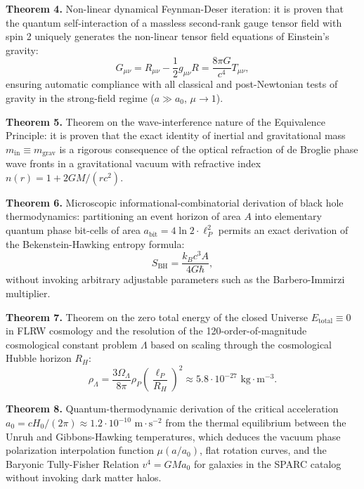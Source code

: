 \documentclass[11pt,a4paper]{article}
\theoremstyle{definition}
\begin{document}
\textbf{Theorem 4.} Non-linear dynamical Feynman-Deser iteration: it is proven that the quantum self-interaction of a massless second-rank gauge tensor field with spin 2 uniquely generates the non-linear tensor field equations of Einstein's gravity:
\begin{equation}\label{eq:0.6}\tag{0.6}
G_{\mu\nu} = R_{\mu\nu} - \frac{1}{2} g_{\mu\nu} R = \frac{8\pi G}{c^4} T_{\mu\nu},
\end{equation}
ensuring automatic compliance with all classical and post-Newtonian tests of gravity in the strong-field regime ($a \gg a_0$, $\mu \to 1$).

\textbf{Theorem 5.} Theorem on the wave-interference nature of the Equivalence Principle: it is proven that the exact identity of inertial and gravitational mass $m_{\text{in}} \equiv m_{\text{grav}}$ is a rigorous consequence of the optical refraction of de Broglie phase wave fronts in a gravitational vacuum with refractive index $n(r) = 1 + 2GM / (rc^2)$.

\textbf{Theorem 6.} Microscopic informational-combinatorial derivation of black hole thermodynamics: partitioning an event horizon of area $A$ into elementary quantum phase bit-cells of area $a_{\text{bit}} = 4\ln 2 \cdot \ell_P^2$ permits an exact derivation of the Bekenstein-Hawking entropy formula:
\begin{equation}\label{eq:0.7}\tag{0.7}
S_{\text{BH}} = \frac{k_B c^3 A}{4 G \hbar},
\end{equation}
without invoking arbitrary adjustable parameters such as the Barbero-Immirzi multiplier.

\textbf{Theorem 7.} Theorem on the zero total energy of the closed Universe $E_{\text{total}} \equiv 0$ in FLRW cosmology and the resolution of the 120-order-of-magnitude cosmological constant problem $\Lambda$ based on scaling through the cosmological Hubble horizon $R_H$:
\begin{equation}\label{eq:0.8}\tag{0.8}
\rho_\Lambda = \frac{3\Omega_\Lambda}{8\pi} \rho_P \left( \frac{\ell_P}{R_H} \right)^2 \approx 5.8 \cdot 10^{-27}\text{ kg}\cdot\text{m}^{-3}.
\end{equation}

\textbf{Theorem 8.} Quantum-thermodynamic derivation of the critical acceleration $a_0 = c H_0 / (2\pi) \approx 1.2 \cdot 10^{-10}\text{ m}\cdot\text{s}^{-2}$ from the thermal equilibrium between the Unruh and Gibbons-Hawking temperatures, which deduces the vacuum phase polarization interpolation function $\mu(a/a_0)$, flat rotation curves, and the Baryonic Tully-Fisher Relation $v^4 = G M a_0$ for galaxies in the SPARC catalog without invoking dark matter halos.
\end{document}
